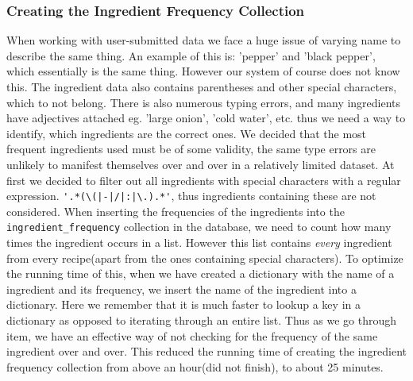 \documentclass{article}
\begin{document}
\subsubsection{Creating the Ingredient Frequency Collection}
When working with user-submitted data we face a huge issue of varying name to describe the
same thing. An example of this is: 'pepper' and 'black pepper', which essentially is the
same thing. However our system of course does not know this. The ingredient data also
contains parentheses and other special characters, which to not belong. There is also
numerous typing errors, and many ingredients have adjectives attached eg. 'large onion',
'cold water', etc. thus we need a way to identify, which ingredients are the correct ones.
We decided that the most frequent ingredients used must be of some validity, the same type
errors are unlikely to manifest themselves over and over in a relatively limited dataset.
At first we decided to filter out all ingredients with special characters with a regular
expression. \lstinline[basicstyle=\normalsize\ttfamily]{'.*(\(|-|/|:|\.).*'}, thus
ingredients containing these are not considered. When inserting the frequencies of the
ingredients into the \texttt{ingredient\_frequency} collection in the database, we need to
count how many times the ingredient occurs in a list. However this list contains
\textit{every} ingredient from every recipe(apart from the ones containing special
characters). To optimize the running time of this, when we have created a dictionary with
the name of a ingredient and its frequency, we insert the name of the ingredient into a
dictionary. Here we remember that it is much faster to lookup a key in a dictionary as
opposed to iterating through an entire list. Thus as we go through item, we have an
effective way of not checking for the frequency of the same ingredient over and over. This
reduced the running time of creating the ingredient frequency collection from above an
hour(did not finish), to about 25 minutes.
\end{document}
